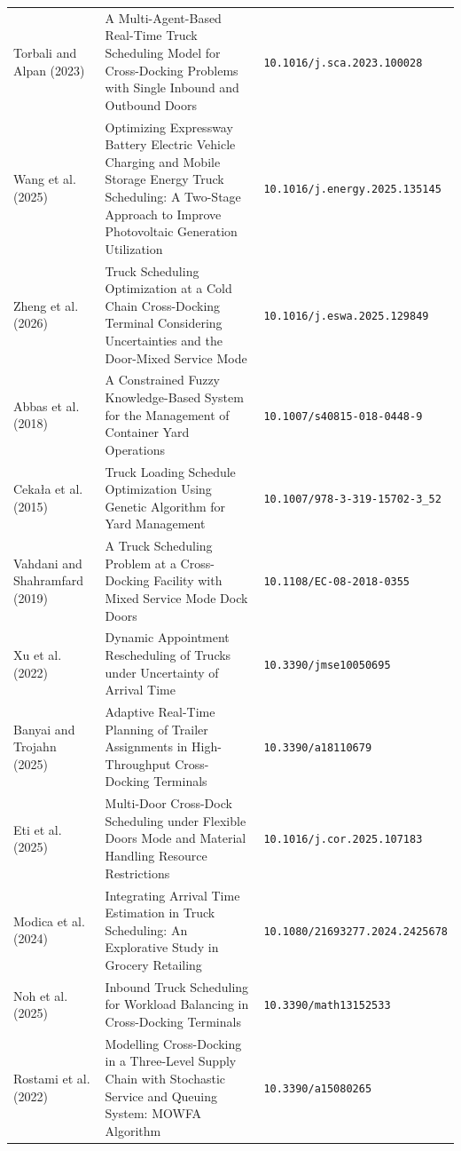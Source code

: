 \documentclass[preprint,12pt,number,longtitle]{elsarticle}
\begin{document}
\begin{longtable}{>{\raggedright\arraybackslash}p{} >{\raggedright\arraybackslash}p{} >{\raggedright\arraybackslash}p{}}
Torbali and Alpan (2023) & A Multi-Agent-Based Real-Time Truck Scheduling Model for Cross-Docking Problems with Single Inbound and Outbound Doors & \nolinkurl{10.1016/j.sca.2023.100028} \\
Wang et al. (2025) & Optimizing Expressway Battery Electric Vehicle Charging and Mobile Storage Energy Truck Scheduling: A Two-Stage Approach to Improve Photovoltaic Generation Utilization & \nolinkurl{10.1016/j.energy.2025.135145} \\
Zheng et al. (2026) & Truck Scheduling Optimization at a Cold Chain Cross-Docking Terminal Considering Uncertainties and the Door-Mixed Service Mode & \nolinkurl{10.1016/j.eswa.2025.129849} \\
Abbas et al. (2018) & A Constrained Fuzzy Knowledge-Based System for the Management of Container Yard Operations & \nolinkurl{10.1007/s40815-018-0448-9} \\
Cekała et al. (2015) & Truck Loading Schedule Optimization Using Genetic Algorithm for Yard Management & \nolinkurl{10.1007/978-3-319-15702-3_52} \\
Vahdani and Shahramfard (2019) & A Truck Scheduling Problem at a Cross-Docking Facility with Mixed Service Mode Dock Doors & \nolinkurl{10.1108/EC-08-2018-0355} \\
Xu et al. (2022) & Dynamic Appointment Rescheduling of Trucks under Uncertainty of Arrival Time & \nolinkurl{10.3390/jmse10050695} \\
Banyai and Trojahn (2025) & Adaptive Real-Time Planning of Trailer Assignments in High-Throughput Cross-Docking Terminals & \nolinkurl{10.3390/a18110679} \\
Eti et al. (2025) & Multi-Door Cross-Dock Scheduling under Flexible Doors Mode and Material Handling Resource Restrictions & \nolinkurl{10.1016/j.cor.2025.107183} \\
Modica et al. (2024) & Integrating Arrival Time Estimation in Truck Scheduling: An Explorative Study in Grocery Retailing & \nolinkurl{10.1080/21693277.2024.2425678} \\
Noh et al. (2025) & Inbound Truck Scheduling for Workload Balancing in Cross-Docking Terminals & \nolinkurl{10.3390/math13152533} \\
Rostami et al. (2022) & Modelling Cross-Docking in a Three-Level Supply Chain with Stochastic Service and Queuing System: {{MOWFA}} Algorithm & \nolinkurl{10.3390/a15080265} \\
\end{longtable}

\normalsize
\end{document}
